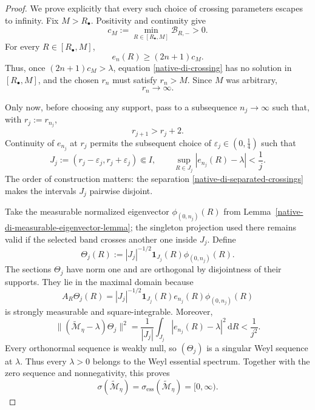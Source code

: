 \begin{proof}
We prove explicitly that every such choice of crossing parameters escapes
to infinity.  Fix \(M>R_\bullet\).  Positivity and continuity give
\[
 c_M:=\min_{R\in[R_\bullet,M]}\mathcal B_{R,-}>0.
\]
For every \(R\in[R_\bullet,M]\),
\[
 e_n(R)\ge(2n+1)c_M.
\]
Thus, once \((2n+1)c_M>\lambda\), equation
\eqref{native-di-crossing} has no solution in
\([R_\bullet,M]\), and the chosen \(r_n\) must satisfy \(r_n>M\).
Since \(M\) was arbitrary,
\begin{equation}
 r_n\longrightarrow\infty.
\label{native-di-crossings-escape}
\end{equation}

Only now, before choosing any support, pass to a subsequence
\(n_j\to\infty\) such that, with \(r_j:=r_{n_j}\),
\begin{equation}
 r_{j+1}>r_j+2.
\label{native-di-separated-crossings}
\end{equation}
Continuity of \(e_{n_j}\) at \(r_j\) permits the subsequent choice of
\(\varepsilon_j\in(0,\tfrac14)\) such that
\[
 J_j:=(r_j-\varepsilon_j,r_j+\varepsilon_j)\Subset I,
 \qquad
 \sup_{R\in J_j}|e_{n_j}(R)-\lambda|<\frac1j.
\]
The order of construction matters: the separation
\eqref{native-di-separated-crossings} makes the intervals \(J_j\)
pairwise disjoint.

Take the measurable normalized eigenvector
\(\phi_{(0,n_j)}(R)\) from
Lemma~\ref{native-di-measurable-eigenvector-lemma}; the singleton
projection used there remains valid if the selected band crosses another
one inside \(J_j\).  Define
\begin{equation}
 \Theta_j(R)
 :=|J_j|^{-1/2}\mathbf 1_{J_j}(R)\phi_{(0,n_j)}(R).
\label{native-di-positive-Weyl-sequence}
\end{equation}
The sections \(\Theta_j\) have norm one and are orthogonal by disjointness
of their supports.  They lie in the maximal domain because
\[
 A_R\Theta_j(R)
 =|J_j|^{-1/2}\mathbf 1_{J_j}(R)
   e_{n_j}(R)\phi_{(0,n_j)}(R)
\]
is strongly measurable and square-integrable.  Moreover,
\[
 \|(\widetilde{\mathscr M}_\eta-\lambda)\Theta_j\|^2
 =\frac1{|J_j|}\int_{J_j}
   |e_{n_j}(R)-\lambda|^2\,\mathrm d R
 <\frac1{j^2}.
\]
Every orthonormal sequence is weakly null, so
\((\Theta_j)\) is a singular Weyl sequence at \(\lambda\).
Thus every \(\lambda>0\) belongs to the Weyl essential spectrum.  Together
with the zero sequence and nonnegativity, this proves
\begin{equation}
 \sigma(\widetilde{\mathscr M}_\eta)
 =\sigma_{\mathrm{ess}}(\widetilde{\mathscr M}_\eta)
 =[0,\infty).
\label{native-di-spectrum-essential}
\end{equation}


\end{proof}
